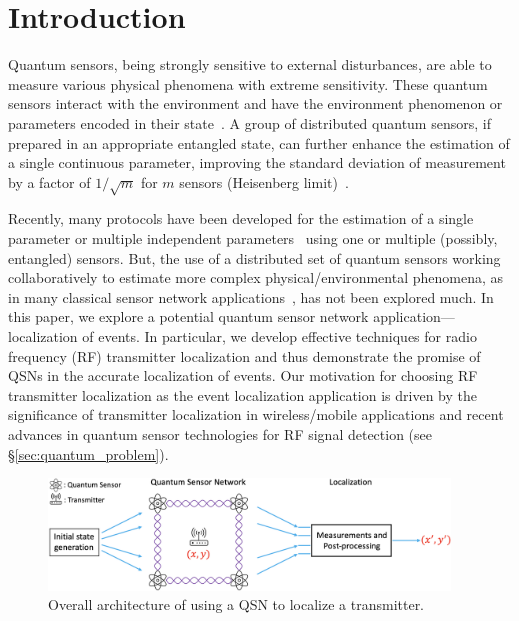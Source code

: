 \section{Introduction}

Quantum sensors, being strongly sensitive to external disturbances, are able to measure various physical phenomena with extreme sensitivity.
These quantum sensors interact with the environment and have the environment phenomenon or parameters encoded in their state~\cite{RevModPhys.quantumsensing}.
A group of distributed quantum sensors, if prepared in an appropriate entangled state, can further enhance the estimation of a single continuous parameter, improving the standard deviation of measurement by a factor of $1/\sqrt{m}$ for $m$ sensors (Heisenberg limit)~\cite{Giovannetti_2011}.

Recently, many protocols have been developed for the estimation of a single 
parameter or multiple independent parameters~\cite{Giovannetti_2011,Proctor_2018} using one or multiple (possibly, entangled) sensors. 
But, the use of a distributed set of quantum sensors working collaboratively 
to estimate more complex physical/environmental phenomena, as in many classical
sensor network applications~\cite{tsn17-water, sensys10-health,mobicom03-sensor}, 
has not been explored much.
In this paper, we explore a potential quantum sensor network application--- localization of events.
In particular, we develop effective techniques 
for radio frequency (RF) transmitter localization and thus demonstrate the promise of QSNs in the accurate localization of events. Our motivation for choosing 
RF transmitter localization as the event localization 
application is driven by the significance of transmitter localization
in  wireless/mobile applications and recent advances in quantum sensor
technologies for RF signal detection (see \S\ref{sec:quantum_problem}).

\begin{figure}[t]
    \centering
    \includegraphics[width=0.95\textwidth]{chapters/qce/figures/overall.png}
    \caption{Overall architecture of using a QSN to localize a transmitter. 
    }
    \label{fig:quantumoverall}
\end{figure}

